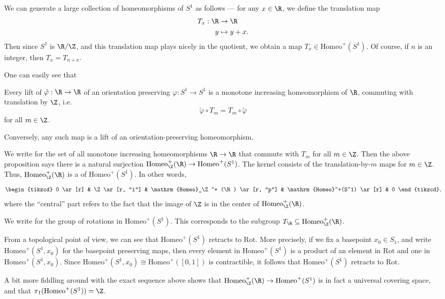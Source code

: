 \documentclass[a4paper]{article}
\newcommand\Homeo{\mathrm{Homeo}}
\newcommand\Rot{\mathrm{Rot}}
\begin{document}
We can generate a large collection of homeomorphisms of $S^1$ as follows --- for any $x \in \R$, we define the translation map
\begin{align*}
  T_x: \R &\to \R\\
  y &\mapsto y + x.
\end{align*}
Then since $S^1$ is $\R/\Z$, and this translation map plays nicely in the quotient, we obtain a map $T_x \in \Homeo^+(S^1)$. Of course, if $n$ is an integer, then $T_x = T_{n + x}$.

One can easily see that
\begin{prop}
  Every lift of $\tilde{\varphi}: \R \to \R$ of an orientation preserving $\varphi: S^1 \to S^1$ is a monotone increasing homeomorphism of $\R$, commuting with translation by $\Z$, i.e.
  \[
    \tilde{\varphi} \circ T_m = T_m \circ \tilde{\varphi}
  \]
  for all $m \in \Z$.

  Conversely, any such map is a lift of an orientation-preserving homeomorphism.
\end{prop}
We write \term{$\Homeo^+_\Z(\R)$} for the set of all monotone increasing homeomorphisms $\R \to \R$ that commute with $T_m$ for all $m \in \Z$. Then the above proposition says there is a natural surjection $\Homeo^+_\Z(\R) \to \Homeo^+(S^1)$. The kernel consists of the translation-by-$m$ maps for $m \in \Z$. Thus, $\Homeo^+_\Z(\R)$ is a  of $\Homeo^+(S^1)$. In other words,
\[
  \begin{tikzcd}
   0 \ar[r] & \Z \ar[r, "i"] & \Homeo_\Z^+ (\R) \ar[r, "p"] & \Homeo^+(S^1) \ar[r] & 0
  \end{tikzcd},
\]
where the ``central'' part refers to the fact that the image of $\Z$ is in the center of $\Homeo_\Z^+(\R)$.

\begin{notation}
  We write \term{$\Rot$} for the group of rotations in $\Homeo^+(S^1)$. This corresponds to the subgroup $T_\R \subseteq \Homeo_\Z^+(\R)$.
\end{notation}

From a topological point of view, we can see that $\Homeo^+(S^1)$ retracts to $\Rot$. More precisely, if we fix a basepoint $x_0 \in S_1$, and write $\Homeo^+(S^1, x_0)$ for the basepoint preserving maps, then every element in $\Homeo^+(S^1)$ is a product of an element in $\Rot$ and one in $\Homeo^+(S^1, x_0)$. Since $\Homeo^+(S^1, x_0) \cong \Homeo^+([0, 1])$ is contractible, it follows that $\Homeo^+(S^1)$ retracts to $\Rot$.

A bit more fiddling around with the exact sequence above shows that $\Homeo^+_{\Z}(\R) \to \Homeo^+(S^1)$ is in fact a universal covering space, and that $\pi_1(\Homeo^+(S^1)) = \Z$.
\end{document}
